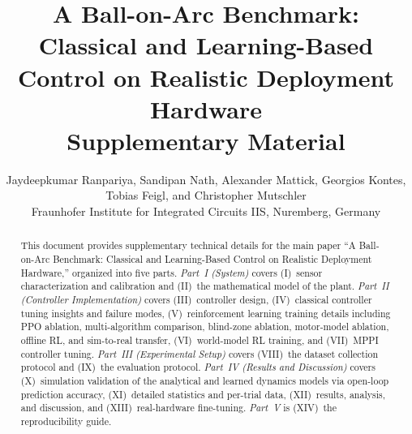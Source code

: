 \documentclass[letterpaper, 10pt, conference]{IEEEtran}
\title{A Ball-on-Arc Benchmark: Classical and Learning-Based Control on Realistic Deployment Hardware\\\Large Supplementary Material}
\author{
Jaydeepkumar Ranpariya, Sandipan Nath, Alexander Mattick, Georgios Kontes, Tobias Feigl, and Christopher Mutschler\\
Fraunhofer Institute for Integrated Circuits IIS, Nuremberg, Germany}
\begin{document}
\maketitle

\begin{abstract}
This document provides supplementary technical details for the main paper
``A Ball-on-Arc Benchmark: Classical and Learning-Based Control on Realistic Deployment Hardware,'' organized into five parts.
\emph{Part~I (System)} covers (I)~sensor characterization and calibration
and (II)~the mathematical model of the plant.
\emph{Part~II (Controller Implementation)} covers (III)~controller design,
(IV)~classical controller tuning insights and failure modes,
(V)~reinforcement learning training details including PPO ablation,
multi-algorithm comparison, blind-zone ablation, motor-model ablation,
offline RL, and sim-to-real transfer, (VI)~world-model RL training, and
(VII)~MPPI controller tuning.
\emph{Part~III (Experimental Setup)} covers (VIII)~the dataset collection
protocol and (IX)~the evaluation protocol.
\emph{Part~IV (Results and Discussion)} covers (X)~simulation validation
of the analytical and learned dynamics models via open-loop prediction
accuracy, (XI)~detailed statistics and per-trial data, (XII)~results,
analysis, and discussion, and (XIII)~real-hardware fine-tuning.
\emph{Part~V} is (XIV)~the reproducibility guide.
\end{abstract}

\tableofcontents
\newpage



















\clearpage



\end{document}
